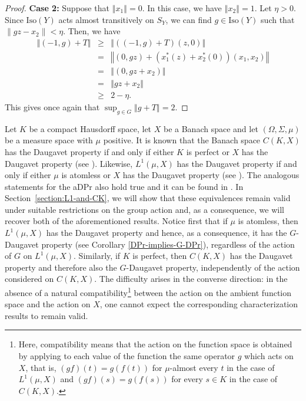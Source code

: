 \documentclass[a4paper,12pt]{amsart}
\theoremstyle{definition}
\theoremstyle{definition}
\theoremstyle{remark}
\numberwithin{equation}{section}
\newcommand{\Iso}{\mathrm{Iso}}
\renewcommand{\geq}{\geqslant}
\newcommand{\<}{\langle}
\renewcommand{\>}{\rangle}
\newcommand{\norm}[1]{\left\Vert#1\right\Vert}
\begin{document}
\begin{proof}
		\noindent
		\textbf{Case 2:} Suppose that $\norm{x_1} = 0$.
		In this case, we have $\norm{x_2}=1$. Let $\eta>0$. Since $\Iso(Y)$ acts almost transitively on $S_Y$, we can find $g\in \Iso(Y)$ such that $\|gz-x_2\|<\eta$. Then, we have
		\begin{eqnarray*}
			\norm{(-1, g) + T}
			&\geq& \norm{((-1, g) + T)(z, 0)} \\
			&=& \norm{\left(0, gz\right) + (x_1^*(z) + x_2^*(0)) (x_1, x_2)} \\
			&=& \norm{\left(0, gz+x_2\right)} \\
			&=& \norm{gz+x_2}\\
			&\geq& 2-\eta.
		\end{eqnarray*}
		This gives once again that $\sup_{g\in G}\norm{g+T}=2$.
	\end{proof}
	
	
	
	Let $K$ be a compact Hausdorff space, let $X$ be a Banach space and let $(\Omega,\Sigma,\mu)$ be a measure space with $\mu$ positive. It is known that the Banach space $C(K,X)$ has the Daugavet property if and only if either $K$ is perfect or $X$ has the Daugavet property (see \cite[Remark 6]{MartinPaya2000}). Likewise, $L^1(\mu,X)$ has the Daugavet property if and only if either $\mu$ is atomless or $X$ has the Daugavet property (see \cite[Remark 9]{MartinPaya2000}). The analogous statements for the aDPr also hold true and it can be found in \cite[Theorem 3.4]{MO2004}. In Section~\ref{section:L1-and-CK}, we will show that these equivalences remain valid under suitable restrictions on the group action and, as a consequence, we will recover both of the aforementioned results. Notice first that if $\mu$ is atomless, then $L^1(\mu,X)$ has the Daugavet property and hence, as a consequence, it has the $G$-Daugavet property (see Corollary \ref{DPr-implies-G-DPr}), regardless of the action of $G$ on $L^1(\mu,X)$. Similarly, if $K$ is perfect, then $C(K,X)$ has the Daugavet property and therefore also the $G$-Daugavet property, independently of the action considered on $C(K,X)$. The difficulty arises in the converse direction: in the absence of a natural compatibility\footnote{Here, compatibility means that the action on the function space is obtained by applying to each value of the function the same operator $g$ which acts on $X$, that is, $(gf)(t)=g(f(t))$ for $\mu$-almost every $t$ in the case of $L^1(\mu,X)$ and $(gf)(s)=g(f(s))$ for every $s\in K$ in the case of $C(K,X)$.
	} between the action on the ambient function space and the action on $X$, one cannot expect the corresponding characterization results to remain valid.
	
\end{document}
